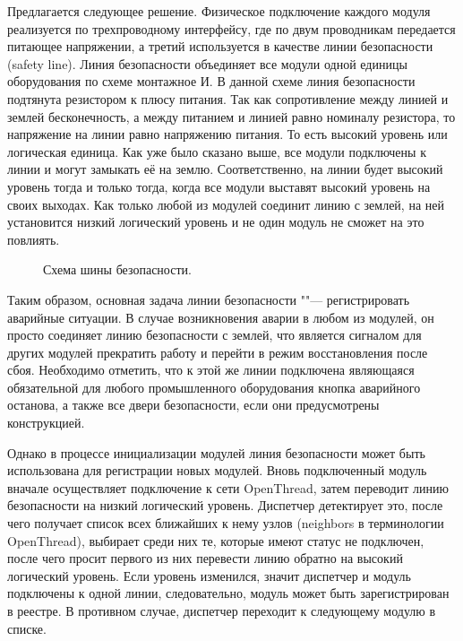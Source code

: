 Предлагается следующее решение. Физическое подключение каждого модуля реализуется по трехпроводному интерфейсу, где по двум проводникам передается питающее напряжении, а третий используется в качестве линии безопасности (safety line). Линия безопасности объединяет все модули одной единицы оборудования по схеме монтажное И. В данной схеме линия безопасности подтянута резистором к плюсу питания. Так как сопротивление между линией и землей бесконечность, а между питанием и линией равно номиналу резистора, то напряжение на линии равно напряжению питания. То есть высокий уровень или логическая единица. Как уже было сказано выше, все модули подключены к линии и могут замыкать её на землю. Соответственно, на линии будет высокий уровень тогда и только тогда, когда все модули выставят высокий уровень на своих выходах. Как только любой из модулей соединит линию с землей, на ней установится низкий логический уровень и не один модуль не сможет на это повлиять.

\begin{figure}[ht]
\caption{Схема шины безопасности.}\label{fig:logic-and}
\end{figure}

Таким образом, основная задача линии безопасности ""--- регистрировать аварийные ситуации. В случае возникновения аварии в любом из модулей, он просто соединяет линию безопасности с землей, что является сигналом для других модулей прекратить работу и перейти в режим восстановления после сбоя. Необходимо отметить, что к этой же линии подключена являющаяся обязательной для любого промышленного оборудования кнопка аварийного останова, а также все двери безопасности, если они предусмотрены конструкцией.

Однако в процессе инициализации модулей линия безопасности может быть использована для регистрации новых модулей. Вновь подключенный модуль вначале осуществляет подключение к сети OpenThread, затем переводит линию безопасности на низкий логический уровень. Диспетчер детектирует это, после чего получает список всех ближайших к нему узлов (neighbors в терминологии OpenThread), выбирает среди них те, которые имеют статус не подключен, после чего просит первого из них перевести линию обратно на высокий логический уровень. Если уровень изменился, значит диспетчер и модуль подключены к одной линии, следовательно, модуль может быть зарегистрирован в реестре. В противном случае, диспетчер переходит к следующему модулю в списке.

